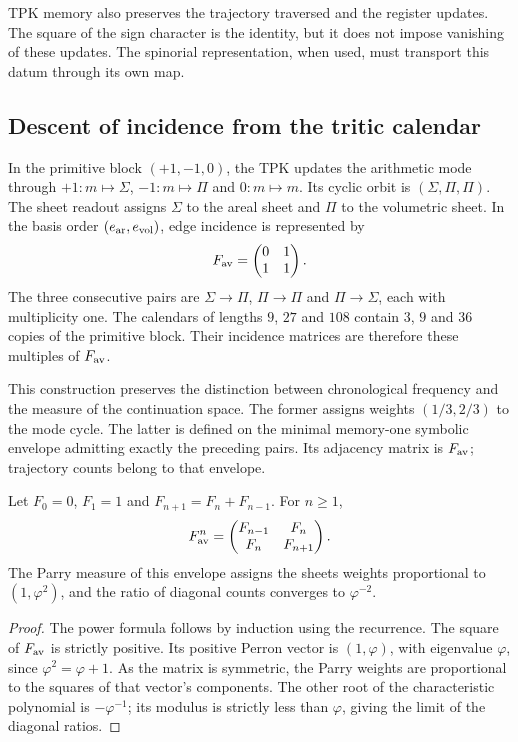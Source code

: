 TPK memory also preserves the trajectory traversed and the register
updates. The square of the sign character is the identity, but it does not impose
vanishing of these updates. The spinorial representation, when
used, must transport this datum through its own map.

\subsection{Descent of incidence from the tritic calendar}

In the primitive block $(+1,-1,0)$, the TPK updates the arithmetic mode through
$+1:m\mapsto\Sigma$, $-1:m\mapsto\Pi$ and $0:m\mapsto m$. Its cyclic orbit
is $(\Sigma,\Pi,\Pi)$. The sheet readout assigns $\Sigma$ to the areal sheet and
$\Pi$ to the volumetric sheet. In the basis order $(e_{\rm ar},e_{\rm vol})$,
edge incidence is represented by
\begin{equation}
 F_{\rm av}=\begin{pmatrix}0&1\\1&1\end{pmatrix}.
 \label{iii:iii:eq:fav}
\end{equation}
The three consecutive pairs are $\Sigma\to\Pi$, $\Pi\to\Pi$ and
$\Pi\to\Sigma$, each with multiplicity one. The calendars of lengths
$9$, $27$ and $108$ contain $3$, $9$ and $36$ copies of the primitive block.
Their incidence matrices are therefore these multiples of $F_{\rm av}$.

This construction preserves the distinction between chronological frequency and the measure
of the continuation space. The former assigns weights $(1/3,2/3)$ to the mode
cycle. The latter is defined on the minimal memory-one symbolic envelope
admitting exactly the preceding pairs. Its adjacency matrix is
$F_{\rm av}$; trajectory counts belong to that envelope.

\begin{proposition}
Let $F_0=0$, $F_1=1$ and $F_{n+1}=F_n+F_{n-1}$. For $n\geq1$,
\begin{equation}
 F_{\rm av}^{n}=
 \begin{pmatrix}F_{n-1}&F_n\\F_n&F_{n+1}\end{pmatrix}.
 \label{iii:iii:eq:fav-powers}
\end{equation}
The Parry measure of this envelope assigns the sheets weights proportional
to $(1,\varphi^2)$, and the ratio of diagonal counts converges to $\varphi^{-2}$.
\end{proposition}
\begin{proof}
The power formula follows by induction using the recurrence.
The square of $F_{\rm av}$ is strictly positive. Its positive Perron
vector is $(1,\varphi)$, with eigenvalue $\varphi$, since
$\varphi^2=\varphi+1$. As the matrix is symmetric, the Parry weights are
proportional to the squares of that vector's components. The other root
of the characteristic polynomial is $-\varphi^{-1}$; its modulus is strictly
less than $\varphi$, giving the limit of the diagonal ratios.
\end{proof}


